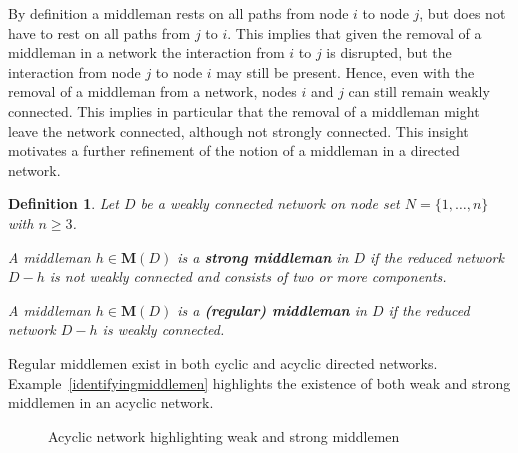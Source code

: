 \documentclass[11pt,fleqn]{article}
\newcounter{llst}
\newenvironment{numm}{\begin{list}{\rm (\roman{llst})}{\usecounter{llst}
\setlength{\itemindent}{0em} \setlength{\leftmargin}{3.5em}
\setlength{\labelwidth}{2.5em} \setlength{\labelsep}{1em}}}{\end{list}}
\newtheorem{definition}[theorem]{Definition}
\begin{document}
By definition a middleman rests on all paths from node $i$ to node $j$, but does not have to rest on all paths from $j$ to $i$. This implies that given the removal of a middleman in a network the interaction from $i$ to $j$ is disrupted, but the interaction from node $j$ to node $i$ may still be present. Hence, even with the removal of a middleman from a network, nodes $i$ and $j$ can still remain weakly connected. This implies in particular that the removal of a middleman might leave the network connected, although not strongly connected. This insight motivates a further refinement of the notion of a middleman in a directed network.

\begin{definition} \label{strongweakmiddlemen} 
Let $D$ be a weakly connected network on node set $N = \{ 1, \ldots ,n \}$ with $n \geqslant 3$.
\begin{numm}
	\item A middleman $h \in \mathbf M (D)$ is a \textbf{strong middleman} in $D$ if the reduced network $D - h$ is not weakly connected and consists of two or more components.

\item A middleman $h \in \mathbf M (D)$ is a \textbf{(regular) middleman} in $D$ if the reduced network $D - h$ is weakly connected.
\end{numm}
\end{definition}

\noindent
Regular middlemen exist in both cyclic and acyclic directed networks. Example~\ref{identifyingmiddlemen} highlights the existence of both weak and strong middlemen in an acyclic network.

\begin{figure}[h]
\begin{center}
\end{center}
\caption{Acyclic network highlighting weak and strong middlemen}
\label{weakmm}
\end{figure}
\end{document}
